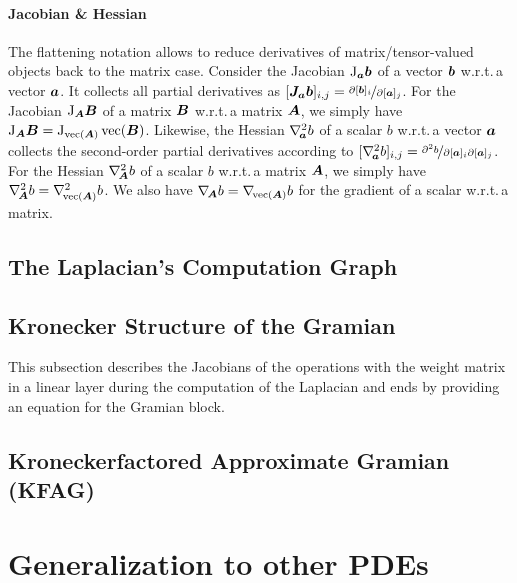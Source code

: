 \documentclass{article}
\begin{document}
\paragraph{Jacobian \& Hessian} The flattening notation allows to reduce derivatives of matrix/tensor-valued objects back to the matrix case.
Consider the Jacobian $\mathrm{J}_{{\bm{a}}}{\bm{b}}$ of a vector ${\bm{b}}$ w.r.t.\,a vector ${\bm{a}}$.
It collects all partial derivatives as $[{\bm{J}}_{{\bm{a}}}{\bm{b}}]_{i,j} = \nicefrac{\partial [{\bm{b}}]_i}{\partial [{\bm{a}}]_j}$.
For the Jacobian $\mathrm{J}_{{\bm{A}}}{\bm{B}}$ of a matrix ${\bm{B}}$ w.r.t.\,a matrix ${\bm{A}}$, we simply have $\mathrm{J}_{{\bm{A}}} {\bm{B}} = \mathrm{J}_{\operatorname{vec}( {\bm{A}} )}\operatorname{vec}({\bm{B}})$.
Likewise, the Hessian $\nabla_{\!{{\bm{a}}}}^{2}b$ of a scalar $b$ w.r.t.\,a vector ${\bm{a}}$ collects the second-order partial derivatives according to $[\nabla_{\!{{\bm{a}}}}^{2}b]_{i,j} = \nicefrac{\partial^2 b}{\partial [{\bm{a}}]_i \partial [{\bm{a}}]_j}$.
For the Hessian $\nabla_{\!{{\bm{A}}}}^{2} b$ of a scalar $b$ w.r.t.\,a matrix ${\bm{A}}$, we simply have $\nabla_{\!{{\bm{A}}}}^{2} b = \nabla_{\!{\operatorname{vec}({\bm{A}})}}^{2}b$.
We also have $\nabla_{\!{{\bm{A}}}} b = \nabla_{\!{\operatorname{vec}({\bm{A}})}} b$ for the gradient of a scalar w.r.t.\,a matrix.

\subsection{The Laplacian's Computation Graph}\label{sec:laplacian-computation-graph}


\subsection{Kronecker Structure of the Gramian}\label{sec:kronecker-structure-gramian}

This subsection describes the Jacobians of the operations with the weight matrix in
a linear layer during the computation of the Laplacian and ends by providing an
equation for the Gramian block.

\subsection{Kroneckerfactored Approximate Gramian (KFAG)}


\section{Generalization to other PDEs}


\end{document}
